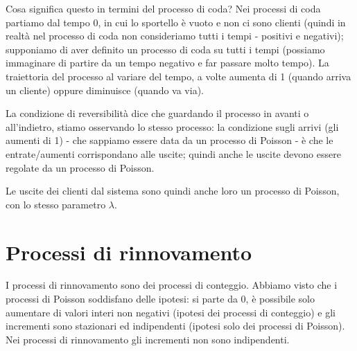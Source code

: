 \documentclass[a4paper,12pt]{book}
\begin{document}
Cosa significa questo in termini del processo di coda? Nei processi di coda partiamo dal tempo 0, in cui lo sportello è vuoto e non ci sono clienti (quindi in realtà nel processo di coda non consideriamo tutti i tempi - positivi e negativi); supponiamo di aver definito un processo di coda su tutti i tempi (possiamo immaginare di partire da un tempo negativo e far passare molto tempo). La traiettoria del processo al variare del tempo, a volte aumenta di 1 (quando arriva un cliente) oppure diminuisce (quando va via).
\begin{center}
\end{center}


La condizione di reversibilità dice che guardando il processo in avanti o all'indietro, stiamo osservando lo stesso processo: la condizione sugli arrivi (gli aumenti di 1) - che sappiamo essere data da un processo di Poisson - è che le entrate/aumenti corrispondano alle uscite; quindi anche le uscite devono essere regolate da un processo di Poisson. 

Le uscite dei clienti dal sistema sono quindi anche loro un processo di Poisson, con lo stesso parametro $\lambda$.

\chapter{Processi di rinnovamento}
I processi di rinnovamento sono dei processi di conteggio. Abbiamo visto che i processi di Poisson soddisfano delle ipotesi: si parte da 0, è possibile solo aumentare di valori interi non negativi (ipotesi dei processi di conteggio) e gli incrementi sono stazionari ed indipendenti (ipotesi solo dei processi di Poisson). Nei processi di rinnovamento gli incrementi non sono indipendenti.
\end{document}
